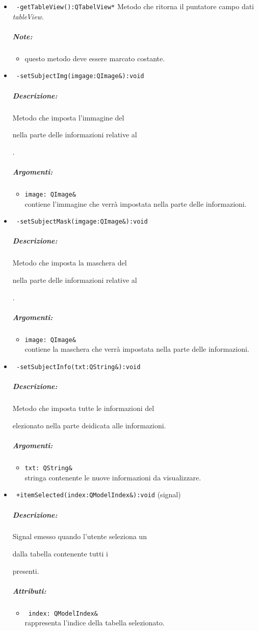 \begin{itemize}
\item\color{blue}\verb! -getTableView():QTabelView*!
\color{black}
Metodo che ritorna il puntatore campo dati \emph{tableView}.
 \subparagraph{Note:}
 \begin{itemize}
 \item questo metodo deve essere marcato costante.
 \end{itemize}

\item\color{blue}\verb! -setSubjectImg(imgage:QImage&):void!
\color{black}
\subparagraph{Descrizione: }Metodo che imposta l'immagine del \subject{} nella parte delle informazioni relative al \subject{}.
\subparagraph{Argomenti:}
\begin{itemize}
\item \color{RoyalPurple}\verb!image: QImage& !\\ contiene l'immagine che verrà impostata nella parte delle informazioni.
\end{itemize}

\item\color{blue}\verb! -setSubjectMask(imgage:QImage&):void!
\color{black}
\subparagraph{Descrizione: }Metodo che imposta la maschera del \subject{} nella parte delle informazioni relative al \subject{}.
\subparagraph{Argomenti:}
\begin{itemize}
\item \color{RoyalPurple}\verb!image: QImage& !\\ contiene la maschera che verrà impostata nella parte delle informazioni.
\end{itemize}

\item\color{blue}\verb! -setSubjectInfo(txt:QString&):void!
\color{black}
\subparagraph{Descrizione: }Metodo che imposta tutte le informazioni del \subject selezionato nella parte deidicata alle informazioni.
\subparagraph{Argomenti:}
\begin{itemize}
\item \color{RoyalPurple}\verb!txt: QString& !\\ stringa contenente le nuove informazioni da visualizzare.
\end{itemize}

\item\color{blue}\verb! +itemSelected(index:QModelIndex&):void! (signal)
\color{black} 
\subparagraph{Descrizione: }
Signal\g{} emesso quando l'utente seleziona un \subject{} dalla tabella contenente tutti i \subject{} presenti.
\subparagraph{Attributi:}
\begin{itemize}
\item \color{RoyalPurple}\verb! index: QModelIndex& ! \\ rappresenta l'indice della tabella selezionato.
\end{itemize}


\end{itemize}
